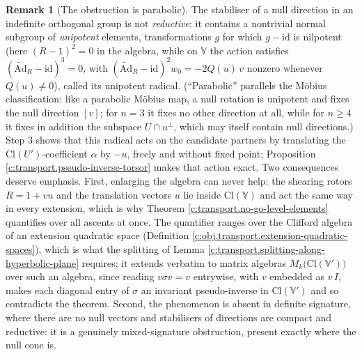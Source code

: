 \documentclass[11pt]{article}
\theoremstyle{definition}
\newtheorem{remark}[theorem]{Remark}
\theoremstyle{plain}
\providecommand{\Ad}{}\renewcommand{\Ad}{\widetilde{\mathrm{Ad}}}
\providecommand{\Cl}{}\renewcommand{\Cl}{\mathrm{Cl}}
\begin{document}
\begin{remark}[The obstruction is parabolic]\label{c:note.transport.obstruction-parabolic}
The stabiliser of a null direction in an indefinite orthogonal group is not \emph{reductive}: it contains a nontrivial normal subgroup of \emph{unipotent} elements, transformations $g$ for which $g - \mathrm{id}$ is nilpotent (here $(R-1)^2 = 0$ in the algebra, while on $\mathbb{V}$ the action satisfies $(\Ad_R - \mathrm{id})^3 = 0$, with $(\Ad_R - \mathrm{id})^2 w_0 = -2Q(u)\,v$ nonzero whenever $Q(u) \neq 0$), called its unipotent radical. (``Parabolic'' parallels the M\"obius classification: like a parabolic M\"obius map, a null rotation is unipotent and fixes the null direction $[v]$; for $n = 3$ it fixes no other direction at all, while for $n \geq 4$ it fixes in addition the subspace $U \cap u^{\perp}$, which may itself contain null directions.) Step 3 shows that this radical acts on the candidate partners by translating the $\Cl(U')$-coefficient $\alpha$ by $-u$, freely and without fixed point; Proposition \ref{c:transport.pseudo-inverse-torsor} makes that action exact. Two consequences deserve emphasis. First, enlarging the algebra can never help: the shearing rotors $R = 1 + vu$ and the translation vectors $u$ lie inside $\Cl(\mathbb{V})$ and act the same way in every extension, which is why Theorem \ref{c:transport.no-go-level-elements} quantifies over all ascents at once. The quantifier ranges over the Clifford algebra of an extension quadratic space (Definition \ref{c:obj.transport.extension-quadratic-spaces}), which is what the splitting of Lemma \ref{c:transport.splitting-along-hyperbolic-plane} requires; it extends verbatim to matrix algebras $M_k\bigl(\Cl(\mathbb{V}')\bigr)$ over such an algebra, since reading $v\sigma v = v$ entrywise, with $v$ embedded as $v\,I$, makes each diagonal entry of $\sigma$ an invariant pseudo-inverse in $\Cl(\mathbb{V}')$ and so contradicts the theorem. Second, the phenomenon is absent in definite signature, where there are no null vectors and stabilisers of directions are compact and reductive: it is a genuinely mixed-signature obstruction, present exactly where the null cone is.
\end{remark}
\end{document}
